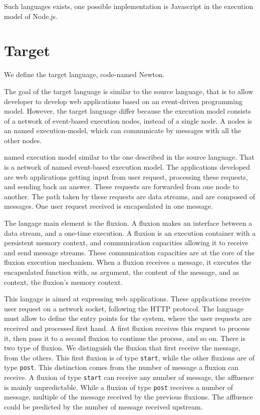 Such languages exists, one possible implementation is Javascript in the execution model of Node.js.

\section{Target}

We define the target language, code-named Newton.

The goal of the target language is similar to the source language, that is to allow developer to develop web applications based on an event-driven programming model.
However, the target language differ because the execution model consists of a network of event-based execution nodes, instead of a single node.
A nodes is an named execution-model, which can communicate by messages with all the other nodes.

named execution model similar to the one described in the source language.
That is a network of named event-based execution model.
The applications developed are web applications getting input from user request, processing these requests, and sending back an answer.
These requests are forwarded from one node to another. 
The path taken by these requests are data streams, and are composed of messages.
One user request received is encapsulated in one message.

The langage main element is the fluxion.
A fluxion makes an interface between a data stream, and a one-time execution.
A fluxion is an execution container with a persistent memory context, and communication capacities allowing it to receive and send message streams.
These communication capacities are at the core of the fluxion execution mechanism.
When a fluxion receives a message, it executes the encapsulated function with, as argument, the content of the message, and as context, the fluxion's memory context.

This langage is aimed at expressing web applications.
These applications receive user request on a network socket, following the HTTP protocol.
The language must allow to define the entry points for the system, where the user requests are received and processed first hand.
A first fluxion receives this request to process it, then pass it to a second fluxion to continue the process, and so on.
There is two type of fluxion.
We distinguish the fluxion that first receive the message, from the others.
This first fluxion is of type \texttt{start}, while the other fluxions are of type \texttt{post}.
This distinction comes from the number of message a fluxion can receive.
A fluxion of type \texttt{start} can receive any number of message, the affluence is mainly unpredictable.
While a fluxion of type \texttt{post} receives a number of message, multiple of the message received by the previous fluxions. The affluence could be predicted by the number of message received upstream.

